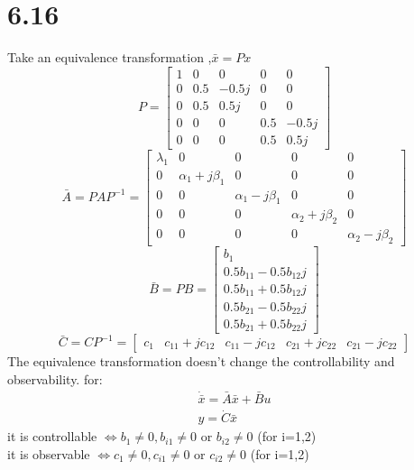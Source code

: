 \documentclass{article}
\begin{document}
\section*{6.16}
Take an equivalence transformation ,$\bar{x}=Px$\\
\[
P=
\left[
    \begin{array}{ccccc}
     1 & 0 & 0 & 0 & 0\\
     0 & 0.5 &-0.5j & 0 & 0\\
     0 & 0.5 &0.5j & 0 & 0\\
     0 & 0 & 0 & 0.5 & -0.5j\\
     0 & 0 & 0 &0.5 &0.5j
    \end{array}
\right]    
\]
\[
\bar{A}=PAP^{-1}=
\left[
    \begin{array}{ccccc}
        \lambda_1 & 0 & 0 &0 & 0\\
        0 & \alpha_1+j\beta_1 & 0 & 0 & 0\\
        0 & 0 & \alpha_1-j\beta_1 & 0 & 0\\
        0 & 0 & 0 & \alpha_2+j\beta_2 & 0\\
        0 & 0 & 0 & 0 & \alpha_2-j\beta_2
    \end{array}
\right]
\]
\[
\bar{B}=PB=
\left[
    \begin{array}{c}
        b_1\\
        0.5b_{11}-0.5b_{12}j\\
        0.5b_{11}+0.5b_{12}j\\
        0.5b_{21}-0.5b_{22}j\\
        0.5b_{21}+0.5b_{22}j
    \end{array}
\right]    
\]
\[
\bar{C}=CP^{-1}
=\left[
    \begin{array}{ccccc}
        c_1 & c_{11}+jc_{12} & c_{11}-jc_{12} & c_{21}+jc_{22} & c_{21}-jc_{22}
    \end{array}
\right]    
\]
The equivalence transformation doesn't change the controllability and observability.
for:
\[
\begin{split}
\dot{\bar{x}}=\bar{A}\bar{x}+\bar{B}u\\
y=\dot{C}\bar{x}    
\end{split}
\]
it is controllable $\iff b_1 \neq 0,b_{i1} \neq 0$ or $ b_{i2} \neq 0 $ (for i=1,2)\\
it is observable $\iff c_1 \neq 0,c_{i1} \neq 0$ or $ c_{i2} \neq 0 $ (for i=1,2)
\end{document}

